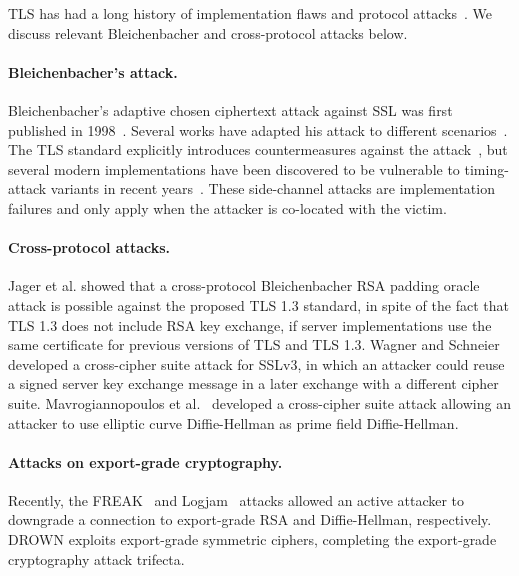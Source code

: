TLS has had a long history of implementation flaws and protocol
attacks~\cite{poodle-2014,crime-attack,rc4-biases-2013,lucky-13-2013,beast-2011,sloth-2016,heartbleed-2014}.
We discuss relevant Bleichenbacher and cross-protocol attacks below.

\paragraph{Bleichenbacher's attack.}
Bleichenbacher's adaptive chosen ciphertext attack against SSL was first
published in 1998~\cite{bleichenbacher-1998}. Several works have adapted his
attack to different
scenarios~\cite{klima-rsa-tls-2003,efficient-padding-oracle-2012,jager-2012}.
The TLS standard explicitly introduces countermeasures against the
attack~\cite{rfc5246}, but several modern implementations have been
discovered to be vulnerable to timing-attack variants in recent
years~\cite{meyer-2014,zhang-2014}. These side-channel
attacks are implementation failures and only apply when the attacker is
co-located with the victim.

\paragraph{Cross-protocol attacks.}
Jager et al.\@ \cite{tls-quic-pkcs-2015} showed that a cross-protocol
Bleichenbacher RSA padding oracle attack is possible against the proposed TLS
1.3 standard, in spite of the fact that TLS 1.3 does not include RSA key
exchange, if server implementations use the same certificate for previous
versions of TLS and TLS 1.3. Wagner and Schneier~\cite{ssl-v3-1996} developed
a cross-cipher suite attack for SSLv3, in which an attacker could reuse a
signed server key exchange message in a later exchange with a different
cipher suite. Mavrogiannopoulos et al.\@~\cite{mvvp-2012} developed a
cross-cipher suite attack allowing an attacker to use elliptic curve
Diffie-Hellman as prime field Diffie-Hellman.

\paragraph{Attacks on export-grade cryptography.}
Recently, the FREAK~\cite{freak-attack-2015} and Logjam~\cite{logjam-2015}
attacks allowed an active attacker to downgrade a connection to export-grade
RSA and Diffie-Hellman, respectively. DROWN exploits export-grade symmetric
ciphers, completing the export-grade cryptography attack trifecta.
